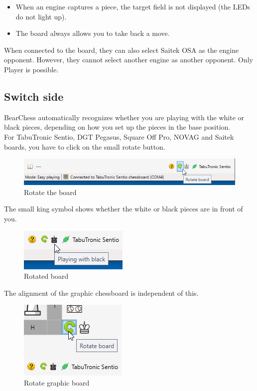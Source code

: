 \documentclass[11pt,a4paper]{article}
\begin{document}
\begin{itemize}
	\item When an engine captures a piece, the target field is not displayed (the LEDs do not light up). 
	\item The board always allows you to take back a move.
\end{itemize}

When connected to the board, they can also select Saitek OSA as the engine opponent.
However, they cannot select another engine as another opponent. Only Player is possible.

\subsection{Switch side}
BearChess automatically recognizes whether you are playing with the white or black pieces, depending on how you set up the pieces in the base position.\\

For TabuTronic Sentio, DGT Pegasus, Square Off Pro, NOVAG and Saitek boards, you have
to click on the small rotate button.

\begin{figure}[H]
	\centering
	\includegraphics[scale=0.75]{rotate1.png}
	\caption{Rotate the board}
	\label{fig:Rotate1}
\end{figure}

The small king symbol shows whether the white or black pieces are in front of you.

\begin{figure}[H]
	\centering
	\includegraphics[scale=1.0]{rotate2.png}
	\caption{Rotated board}
	\label{fig:Rotate2}
\end{figure}

The alignment of the graphic chessboard is independent of this.

\begin{figure}[H]
	\centering
	\includegraphics[scale=1.0]{rotate3.png}
	\caption{Rotate graphic board}
	\label{fig:Rotate3}
\end{figure}
\end{document}
